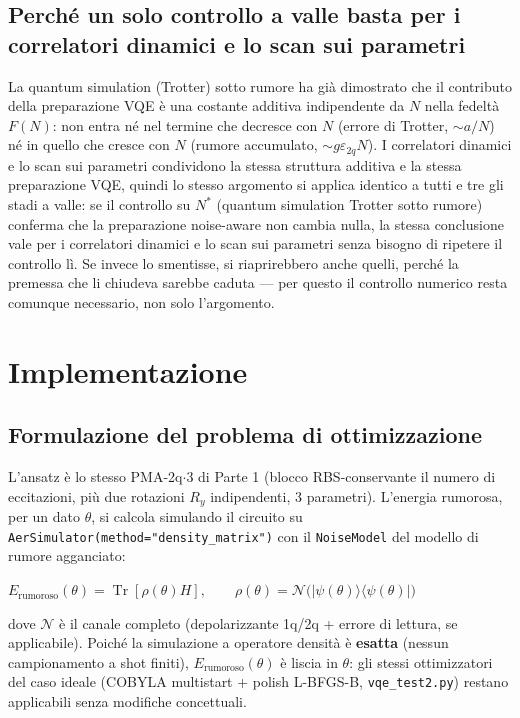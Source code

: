 \documentclass[11pt,a4paper]{article}
\newcommand{\Tr}{\operatorname{Tr}}
\newcommand{\ket}[1]{\lvert #1 \rangle}
\newcommand{\bra}[1]{\langle #1 \rvert}
\begin{document}
\subsection*{Perché un solo controllo a valle basta per i correlatori dinamici e lo scan sui parametri}

La quantum simulation (Trotter) sotto rumore ha già dimostrato che il
contributo della preparazione VQE è
una costante additiva indipendente da $N$ nella fedeltà $F(N)$: non entra
né nel termine che decresce con $N$ (errore di Trotter, $\sim a/N$) né in
quello che cresce con $N$ (rumore accumulato, $\sim g\varepsilon_{2q}N$).
I correlatori dinamici e lo scan sui parametri condividono la stessa
struttura additiva e la stessa preparazione VQE, quindi lo stesso
argomento si applica identico a tutti e tre gli stadi a valle: se il
controllo su $N^*$ (quantum simulation Trotter sotto rumore) conferma che
la preparazione noise-aware non cambia nulla, la stessa conclusione vale
per i correlatori dinamici e lo scan sui parametri senza bisogno di
ripetere il controllo lì. Se invece lo
smentisse, si riaprirebbero anche quelli, perché la premessa che li
chiudeva sarebbe caduta --- per questo il controllo numerico resta
comunque necessario, non solo l'argomento.

\section{Implementazione}

\subsection{Formulazione del problema di ottimizzazione}

L'ansatz è lo stesso PMA-2q$\cdot$3 di Parte 1 (blocco RBS-conservante il
numero di eccitazioni, più due rotazioni $R_y$ indipendenti, 3 parametri).
L'energia rumorosa, per un dato $\theta$, si calcola simulando il
circuito su \texttt{AerSimulator(method="density\_matrix")} con il
\texttt{NoiseModel} del modello di rumore agganciato:

\begin{keyeq}
\centering
$E_\text{rumoroso}(\theta) = \Tr[\rho(\theta) H], \qquad \rho(\theta) = \mathcal{N}\!\big(\ket{\psi(\theta)}\bra{\psi(\theta)}\big)$
\end{keyeq}

dove $\mathcal N$ è il canale completo (depolarizzante 1q/2q + errore di
lettura, se applicabile). Poiché la simulazione a operatore densità è
\textbf{esatta} (nessun campionamento a shot finiti), $E_\text{rumoroso}(\theta)$
è liscia in $\theta$: gli stessi ottimizzatori del caso ideale (COBYLA
multistart + polish L-BFGS-B, \texttt{vqe\_test2.py}) restano applicabili
senza modifiche concettuali.
\end{document}
